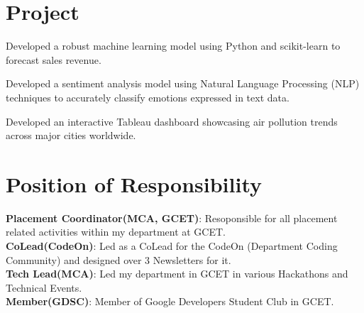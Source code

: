 \documentclass[]{deedy-resume-openfont}
\begin{document}
\begin{minipage}[t]{0.66\textwidth}
\section{Project}
\begin{tightemize}
\item Developed a robust machine learning model using Python and scikit-learn to forecast sales revenue.
\end{tightemize}
\sectionsep

\begin{tightemize}
\item Developed a sentiment analysis model using Natural Language Processing (NLP) techniques to accurately classify emotions expressed in text data.
\end{tightemize}
\sectionsep

\begin{tightemize}
\item Developed an interactive Tableau dashboard showcasing air pollution trends across major cities worldwide.

\end{tightemize}
\sectionsep


\section{Position of Responsibility} 
\textbullet{} \textbf{Placement Coordinator(MCA, GCET)}: Resoponsible for all placement related activities within my department at GCET.\\
\textbullet{} \textbf{CoLead(CodeOn)}: Led as a CoLead for the CodeOn (Department Coding Community) and designed over 3 Newsletters for it.\\
\textbullet{} \textbf{Tech Lead(MCA)}: Led my department in GCET in various Hackathons and Technical Events.\\
\textbullet{} \textbf{Member(GDSC)}: Member of Google Developers Student Club in GCET.
\end{minipage} 
\end{document}
